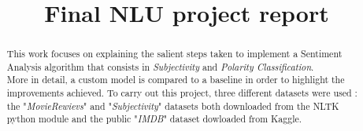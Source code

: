 \documentclass[a4paper]{article}
\title{Final NLU project report}
\begin{document}
\maketitle

\begin{abstract}
    This work focuses on explaining the salient steps taken to implement a Sentiment Analysis algorithm that consists in \textit{Subjectivity} and \textit{Polarity Classification}.\\
    More in detail, a custom model is compared to a baseline in order to highlight the improvements achieved. To carry out this project, three different datasets were used : 
    the "\textit{MovieRewievs}" and  "\textit{Subjectivity}" datasets both downloaded from the NLTK python module and the public "\textit{IMDB}" dataset dowloaded from Kaggle\cite{kaggle}.\\
\end{abstract}







\end{document}
